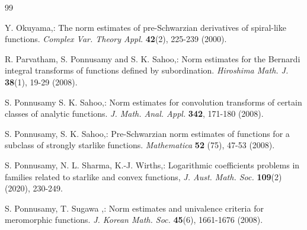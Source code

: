 \documentclass[a4paper,12pt]{amsart}
\theoremstyle{plain}
\theoremstyle{definition}
\theoremstyle{plain}
\begin{document}
\begin{thebibliography}{99}





 {\sc Y. Okuyama},: The norm estimates of pre-Schwarzian derivatives of spiral-like functions. \textit{ Complex Var. Theory Appl.} \textbf{42}(2), 225-239 (2000). 

 {\sc R. Parvatham}, {\sc S. Ponnusamy} and {\sc S. K. Sahoo},:  Norm estimates for the Bernardi integral transforms of functions defined by subordination. \textit{ Hiroshima Math. J.} \textbf{38}(1), 19-29 (2008). 

 {\sc S. Ponnusamy}  {\sc S. K. Sahoo},: Norm estimates for convolution transforms of certain classes of analytic	functions. \textit{ J. Math. Anal. Appl.} \textbf{342}, 171-180 (2008).

 {\sc S. Ponnusamy}, {\sc S. K. Sahoo},: Pre-Schwarzian norm estimates of functions for a subclass of strongly starlike functions. \textit{ Mathematica} \textbf{52} (75), 47-53 (2008).

 {\sc S. Ponnusamy, N. L. Sharma, K.-J. Wirths},: Logarithmic coefficients problems in families related to starlike and convex functions, \textit{J. Aust. Math. Soc.} \textbf{109}(2)(2020), 230-249.

 {\sc S. Ponnusamy}, {\sc T. Sugawa },: Norm estimates and univalence criteria for meromorphic functions. \textit{J. Korean Math. Soc.} \textbf{45}(6), 1661-1676 (2008).




\end{thebibliography}
\end{document}
